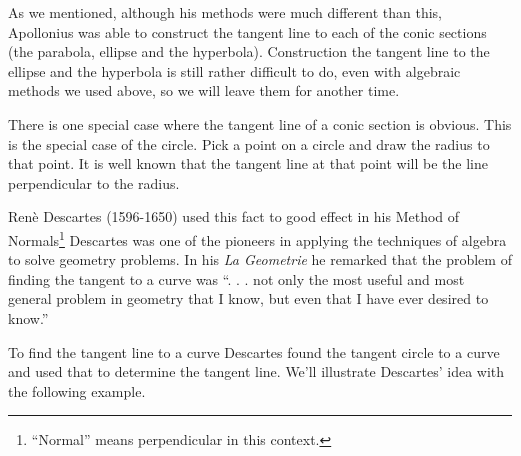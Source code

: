 As we mentioned, although his methods were much different than this,
Apollonius was able to construct the tangent line to each of the conic
sections (the parabola, ellipse and the hyperbola). Construction the
tangent line to the ellipse and the hyperbola is still rather
difficult to do, even with algebraic methods we used above, so we will leave
them for another time.


There is one special case where the tangent line of a conic section is
obvious. This is the special case of the circle. Pick a point on a
circle and draw the radius to that point. It is well known that
the tangent line at that point will be the line perpendicular to the
radius.

Ren\`e{} Descartes (1596-1650) used this fact to good effect in his
Method of Normals\footnote{``Normal'' means perpendicular in this
  context.}  Descartes was one of the pioneers in applying the
techniques of algebra to solve geometry problems.  In his \emph{La
  Geometrie} he remarked that the problem of finding the tangent to a
curve was ``. . .  not only the most useful and most general problem
in geometry that I know, but even that I have ever desired to know.''




To find the tangent line to a curve Descartes found the tangent circle
to a curve and used that to determine the tangent line.  We'll
illustrate Descartes' idea with the following example.

